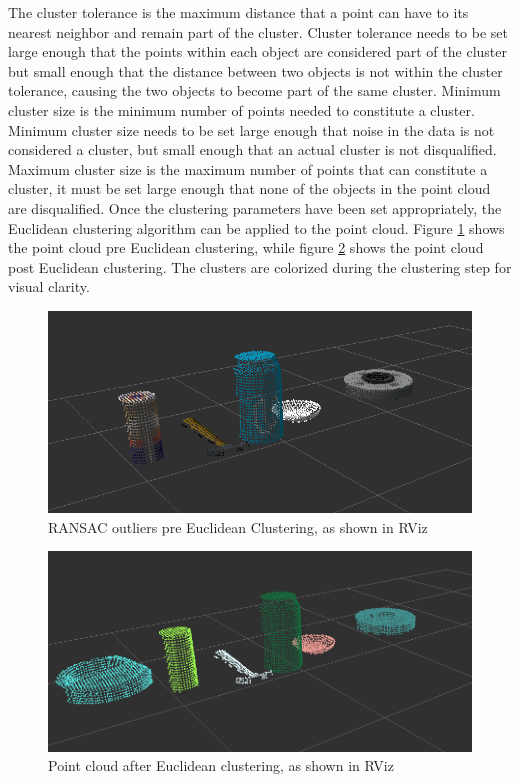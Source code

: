 \documentclass{article}
\begin{document}
The cluster tolerance is the maximum distance that a point can have to its nearest neighbor and remain part of the cluster. Cluster tolerance needs to be set large enough that the points within each object are considered part of the cluster but small enough that the distance between two objects is not within the cluster tolerance, causing the two objects to become part of the same cluster.
Minimum cluster size is the minimum number of points needed to constitute a cluster. Minimum cluster size needs to be set large enough that noise in the data is not considered a cluster, but small enough that an actual cluster is not disqualified. 
Maximum cluster size is the maximum number of points that can constitute a cluster, it must be set large enough that none of the objects in the point cloud are disqualified.
Once the clustering parameters have been set appropriately, the Euclidean clustering algorithm can be applied to the point cloud. Figure \ref{fig:preec} shows the point cloud pre Euclidean clustering, while figure \ref{fig:ec} shows the point cloud post Euclidean clustering. The clusters are colorized during the clustering step for visual clarity.

\begin{figure}[H]
    \includegraphics[width=\linewidth]{preec.png}
    \caption{RANSAC outliers pre Euclidean Clustering, as shown in RViz}
    \label{fig:preec}
\end{figure}

\begin{figure}[H]
    \includegraphics[width=\linewidth]{ec.png}
    \caption{Point cloud after Euclidean clustering, as shown in RViz}
    \label{fig:ec}
\end{figure}
\end{document}
